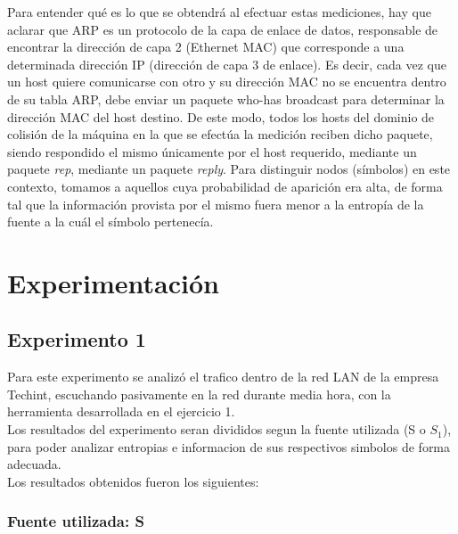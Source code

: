 \documentclass[final,narroweqnarray,inline]{ieee}
\begin{document}
\medskip
Para entender qué es lo que se obtendrá al efectuar estas mediciones, hay que aclarar que
ARP es un protocolo de la capa de enlace de datos, responsable de encontrar
la dirección de capa 2 (Ethernet MAC) que corresponde a una determinada
dirección IP (dirección de capa 3 de enlace). Es decir, cada vez que un host
quiere comunicarse con otro y su dirección MAC no se encuentra dentro de su
tabla ARP, debe enviar un paquete who-has broadcast para determinar la dirección MAC
del host destino. De este modo, todos los hosts del dominio de colisión de
la máquina en la que se efectúa la medición reciben dicho paquete, siendo respondido el mismo únicamente
por el host requerido, mediante un paquete \emph{rep}, mediante un paquete \emph{reply}.
Para distinguir nodos (símbolos) en este contexto, tomamos a aquellos cuya
probabilidad de aparición era alta, de forma tal que la información provista
por el mismo fuera menor a la entropía de la fuente a la cuál el símbolo pertenecía.



\section{Experimentación}


\subsection{Experimento 1}
Para este experimento se analiz\'o el trafico dentro de la red LAN de la empresa Techint, escuchando pasivamente
en la red durante media hora, con la herramienta desarrollada en el ejercicio 1. \\
Los resultados del experimento seran divididos segun la fuente utilizada (S o $S_{1}$), para poder analizar
entropias e informacion de sus respectivos simbolos de forma adecuada. \\
Los resultados obtenidos fueron los siguientes: 

\subsubsection{Fuente utilizada: S}

\end{document}
